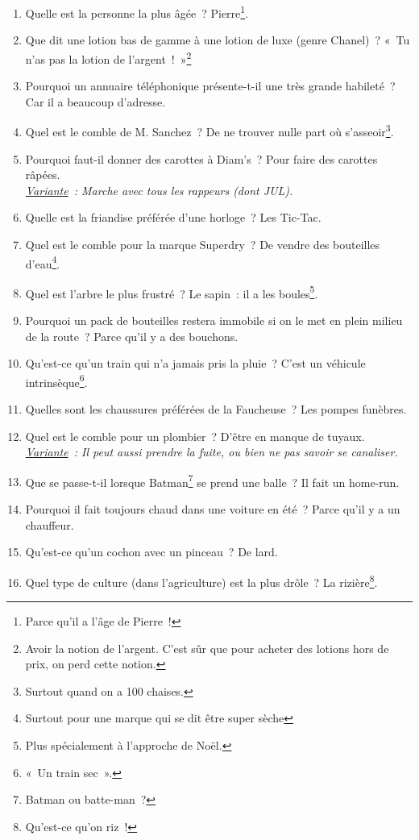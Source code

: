 \documentclass[10pt,a5paper,fullpage]{book}
\begin{document}
\begin{enumerate}
		\item Quelle est la personne la plus âgée~? Pierre\footnote{Parce qu’il a l’âge de Pierre~!}.
		\item Que dit une lotion bas de gamme à une lotion de luxe (genre Chanel)~? «~Tu n’as pas la lotion de l’argent~!~»\footnote{Avoir la notion de l'argent. C'est sûr que pour acheter des lotions hors de prix, on perd cette notion.}
		\item Pourquoi un annuaire téléphonique présente-t-il une très grande habileté~? Car il a beaucoup d’adresse.
		\item Quel est le comble de M. Sanchez~? De ne trouver nulle part où s’asseoir\footnote{Surtout quand on a 100 chaises.}.
		\item Pourquoi faut-il donner des carottes à Diam’s~? Pour faire des carottes râpées. \\\textit{\underline{Variante}~: Marche avec tous les rappeurs (dont JUL).}
		\item Quelle est la friandise préférée d’une horloge~? Les Tic-Tac.
		\item Quel est le comble pour la marque Superdry~? De vendre des bouteilles d’eau\footnote{Surtout pour une marque qui se dit être \guillemotleft super sèche \guillemotright}. 
		\item Quel est l’arbre le plus frustré~? Le sapin~: il a les boules\footnote{Plus spécialement à l'approche de Noël.}.
		\item Pourquoi un pack de bouteilles restera immobile si on le met en plein milieu de la route~? Parce qu’il y a des bouchons. 
		\item Qu’est-ce qu’un train qui n’a jamais pris la pluie~? C’est un véhicule intrinsèque\footnote{«~Un train sec~».}.
		\item Quelles sont les chaussures préférées de la Faucheuse~? Les pompes funèbres.
		\item Quel est le comble pour un plombier~? D’être en manque de tuyaux. \\\textit{\underline{Variante}~: Il peut aussi prendre la fuite, ou bien ne pas savoir se canaliser.}
		\item Que se passe-t-il lorsque Batman\footnote{Batman ou batte-man~?} se prend une balle~? Il fait un home-run.
		\item Pourquoi il fait toujours chaud dans une voiture en été~? Parce qu’il y a un chauffeur.
		\item Qu’est-ce qu’un cochon avec un pinceau~? De lard.
		\item Quel type de culture (dans l’agriculture) est la plus drôle~? La rizière\footnote{Qu’est-ce qu’on riz~!}.

\end{enumerate}
\end{document}
